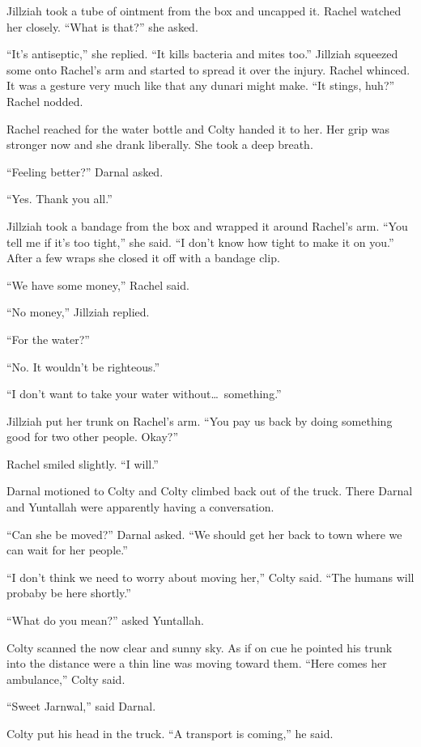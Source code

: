 Jillziah took a tube of ointment from the box and uncapped it. Rachel watched her closely.
``What is that?'' she asked.

``It's antiseptic,'' she replied. ``It kills bacteria and mites too.'' Jillziah squeezed some
onto Rachel's arm and started to spread it over the injury. Rachel whinced. It was a gesture
very much like that any dunari might make. ``It stings, huh?'' Rachel nodded.

Rachel reached for the water bottle and Colty handed it to her. Her grip was stronger now and
she drank liberally. She took a deep breath.

``Feeling better?'' Darnal asked.

``Yes. Thank you all.''

Jillziah took a bandage from the box and wrapped it around Rachel's arm. ``You tell me if it's
too tight,'' she said. ``I don't know how tight to make it on you.'' After a few wraps she
closed it off with a bandage clip.

``We have some money,'' Rachel said.

``No money,'' Jillziah replied.

``For the water?''

``No. It wouldn't be righteous.''

``I don't want to take your water without\ldots\ something.''

Jillziah put her trunk on Rachel's arm. ``You pay us back by doing something good for two other
people. Okay?''

Rachel smiled slightly. ``I will.''

Darnal motioned to Colty and Colty climbed back out of the truck. There Darnal and Yuntallah
were apparently having a conversation.

``Can she be moved?'' Darnal asked. ``We should get her back to town where we can wait for her
people.''

``I don't think we need to worry about moving her,'' Colty said. ``The humans will probaby be
here shortly.''

``What do you mean?'' asked Yuntallah.

Colty scanned the now clear and sunny sky. As if on cue he pointed his trunk into the distance
were a thin line was moving toward them. ``Here comes her ambulance,'' Colty said.

``Sweet Jarnwal,'' said Darnal.

Colty put his head in the truck. ``A transport is coming,'' he said.

